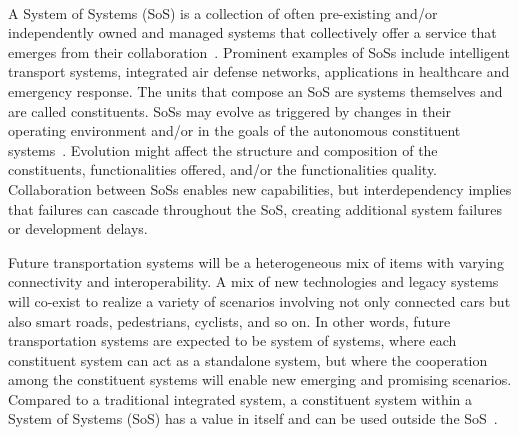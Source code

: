 \documentclass{llncs}
\begin{document}






\maketitle              %

%

~\\

A System of Systems (SoS) is a collection of often pre-existing and/or independently owned and managed systems that collectively offer a service that emerges from their collaboration~\cite{SoSInnovation,Fitzgerald2014,SoS}. Prominent examples of SoSs include intelligent transport systems, integrated air defense networks, applications in healthcare and emergency response. The units that compose an SoS are systems themselves and are called constituents. SoSs may evolve as triggered by changes in their operating environment and/or in the goals of the autonomous constituent systems~\cite{Fitzgerald2014,MeaningOfOf}. Evolution might affect the structure and composition of the constituents, functionalities offered, and/or the functionalities quality. Collaboration between SoSs enables new capabilities, but interdependency implies that failures can cascade throughout the SoS, creating additional system failures or development delays.

Future transportation systems will be a heterogeneous mix of items with varying connectivity and interoperability. A mix of new technologies and legacy systems will co-exist to realize a variety of scenarios involving not only connected cars but also smart roads, pedestrians, cyclists, and so on. In other words, future transportation systems are expected to be system of systems, where each constituent system can act as a standalone system, but where the cooperation among the constituent systems will enable new emerging and promising scenarios. Compared to a traditional integrated system, a constituent system within a System of Systems (SoS) has a value in itself and can be used outside the SoS~\cite{Jakob}.
\end{document}
